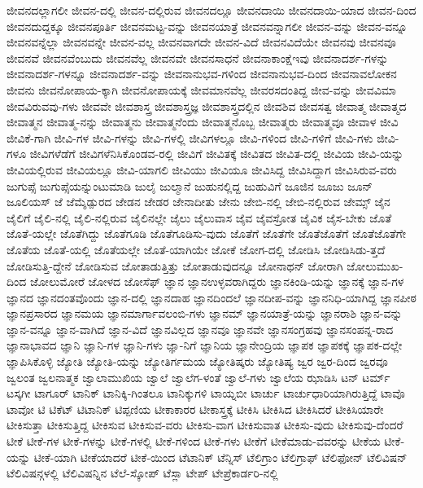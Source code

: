 {ಜೀವನದಲ್ಲಾಗಲೀ
ಜೀವನ-ದಲ್ಲಿ
ಜೀವನ-ದಲ್ಲಿರುವ
ಜೀವನದಲ್ಲೂ
ಜೀವನದಾಯಿ
ಜೀವನದಾಯಿ-ಯಾದ
ಜೀವನ-ದಿಂದ
ಜೀವನದುದ್ದಕ್ಕೂ
ಜೀವನಪೂರ್ತಿ
ಜೀವನಮಟ್ಟ-ವನ್ನು
ಜೀವನಯಾತ್ರೆ
ಜೀವನವನ್ನಾಗಲೀ
ಜೀವನ-ವನ್ನು
ಜೀವನ-ವನ್ನೂ
ಜೀವನವನ್ನೆಲ್ಲಾ
ಜೀವನವನ್ನೇ
ಜೀವನ-ವಲ್ಲ
ಜೀವನವಾಗದೇ
ಜೀವನ-ವಿದೆ
ಜೀವನವಿದೆಯೇ
ಜೀವನವು
ಜೀವನವೂ
ಜೀವನವೆ
ಜೀವನವೆಂಬುದು
ಜೀವನವೆಲ್ಲ
ಜೀವನವೇ
ಜೀವನಸಾಧನೆ
ಜೀವನಾಕಾಂಕ್ಷೆಇವು
ಜೀವನಾದರ್ಶ-ಗಳನ್ನು
ಜೀವನಾದರ್ಶ-ಗಳನ್ನೂ
ಜೀವನಾದರ್ಶ-ವನ್ನು
ಜೀವನಾನುಭವ-ಗಳಿಂದ
ಜೀವನಾನುಭವ-ದಿಂದ
ಜೀವನಾವಲೋಕನ
ಜೀವನು
ಜೀವನೋಪಾಯ-ಕ್ಕಾಗಿ
ಜೀವನೋಪಾಯಕ್ಕೆ
ಜೀವಮಾನವೆಲ್ಲ
ಜೀವರಸದಂತಿದ್ದ
ಜೀವ-ವನ್ನು
ಜೀವವಿಮಾ
ಜೀವವಿರುವವು-ಗಳು
ಜೀವವೇ
ಜೀವಶಾಸ್ತ್ರ
ಜೀವಶಾಸ್ತ್ರಜ್ಞ
ಜೀವಶಾಸ್ತ್ರದಲ್ಲಿನ
ಜೀವಶಿವ
ಜೀವಸತ್ವ
ಜೀವಾತ್ಮ
ಜೀವಾತ್ಮದ
ಜೀವಾತ್ಮನ
ಜೀವಾತ್ಮ-ನನ್ನು
ಜೀವಾತ್ಮನು
ಜೀವಾತ್ಮನೆಂದು
ಜೀವಾತ್ಮನೊಬ್ಬ
ಜೀವಾತ್ಮರು
ಜೀವಾತ್ಮವೂ
ಜೀವಾಳ
ಜೀವಿ
ಜೀವಿಕೆ-ಗಾಗಿ
ಜೀವಿ-ಗಳ
ಜೀವಿ-ಗಳನ್ನು
ಜೀವಿ-ಗಳಲ್ಲಿ
ಜೀವಿಗಳಲ್ಲೂ
ಜೀವಿ-ಗಳಿಂದ
ಜೀವಿ-ಗಳಿಗೆ
ಜೀವಿ-ಗಳು
ಜೀವಿ-ಗಳೂ
ಜೀವಿಗಳೆಡೆಗೆ
ಜೀವಿಗಳೆನಿಸಿಕೊಂಡವ-ರಲ್ಲಿ
ಜೀವಿಗೆ
ಜೀವಿತಕ್ಕೆ
ಜೀವಿತದ
ಜೀವಿತ-ದಲ್ಲಿ
ಜೀವಿಯ
ಜೀವಿ-ಯನ್ನು
ಜೀವಿಯಲ್ಲಿರುವ
ಜೀವಿಯಲ್ಲೂ
ಜೀವಿ-ಯಾಗಲಿ
ಜೀವಿಯು
ಜೀವಿಯೂ
ಜೀವಿಸಿದ್ದ
ಜೀವಿಸಿದ್ದಾಗ
ಜೀವಿಸಿರುವ-ವರು
ಜುಗುಪ್ಸೆ
ಜುಗುಪ್ಸೆಯನ್ನುಂಟುಮಾಡಿ
ಜುಲೈ
ಜುಲ್ಮಾನೆ
ಜುಹುನಲ್ಲಿದ್ದ
ಜುಹುವಿಗೆ
ಜೂಜಿನ
ಜೂಜು
ಜೂನ್
ಜೂಲಿಯಸ್
ಜೆ
ಜೆಮ್ಶೆಡ್ಪುರದ
ಜೇಡನ
ಜೇಡರ
ಜೇನಾದೀತು
ಜೇನು
ಜೇಬಿ-ನಲ್ಲಿ
ಜೇಬಿ-ನಲ್ಲಿರುವ
ಜೇಮ್ಸ್
ಜೈನ
ಜೈಲಿಗೆ
ಜೈಲಿ-ನಲ್ಲಿ
ಜೈಲಿ-ನಲ್ಲಿರುವ
ಜೈಲಿನಲ್ಲೇ
ಜೈಲು
ಜೈಲುವಾಸ
ಜೈವ
ಜೈವಸ್ರೋತ
ಜೈವಿಕ
ಜೈಸ-ಬೇಕು
ಜೊತೆ
ಜೊತೆ-ಯಲ್ಲೇ
ಜೊತೆಗಿದ್ದು
ಜೊತೆಗೂಡಿ
ಜೊತೆಗೂಡಿಸು-ವುದು
ಜೊತೆಗೆ
ಜೊತೆಗೇ
ಜೊತೆಜೊತೆಗೆ
ಜೊತೆಜೊತೆಗೇ
ಜೊತೆಯ
ಜೊತೆ-ಯಲ್ಲಿ
ಜೊತೆಯಲ್ಲೇ
ಜೊತೆ-ಯಾಗಿಯೇ
ಜೋಕೆ
ಜೋಗ-ದಲ್ಲಿ
ಜೋಡಿಸಿ
ಜೋಡಿಸಿಡು-ತ್ತದೆ
ಜೋಡಿಸುತ್ತಿ-ದ್ದೇನೆ
ಜೋಡಿಸುವ
ಜೋತಾಡುತ್ತಿತ್ತು
ಜೋತಾಡುವುದನ್ನೂ
ಜೋನಾಥನ್
ಜೋರಾಗಿ
ಜೋಲುಮುಖ-ದಿಂದ
ಜೋಲುಮೋರೆ
ಜೋಳದ
ಜೋಸೆಫ್
ಜ್ಞಾನ
ಜ್ಞಾನಉಳ್ಳವರಾಗಿದ್ದರು
ಜ್ಞಾನಕಿಂಡಿ-ಯನ್ನು
ಜ್ಞಾನಕ್ಕೆ
ಜ್ಞಾನ-ಗಳ
ಜ್ಞಾನದ
ಜ್ಞಾನದಂತವೊಂದು
ಜ್ಞಾನ-ದಲ್ಲಿ
ಜ್ಞಾನದಾಹ
ಜ್ಞಾನದಿಂದಲೆ
ಜ್ಞಾನದೀಪ-ವನ್ನು
ಜ್ಞಾನನಿಧಿ-ಯಾಗಿದ್ದ
ಜ್ಞಾನಪೀಠ
ಜ್ಞಾನಪ್ರಸಾರದ
ಜ್ಞಾನಮಯ
ಜ್ಞಾನಮಾರ್ಗಾವಲಂಬಿ-ಗಳು
ಜ್ಞಾನಮ್
ಜ್ಞಾನಯಾತ್ರೆ-ಯನ್ನು
ಜ್ಞಾನರಾಶಿ
ಜ್ಞಾನ-ವನ್ನು
ಜ್ಞಾನ-ವನ್ನೂ
ಜ್ಞಾನ-ವಾಗಿದೆ
ಜ್ಞಾನ-ವಿದೆ
ಜ್ಞಾನವಿಲ್ಲದ
ಜ್ಞಾನವೂ
ಜ್ಞಾನವೇ
ಜ್ಞಾನಸಂಗ್ರಹವು
ಜ್ಞಾನಸಂಪನ್ನ-ರಾದ
ಜ್ಞಾನಾಭಾವದ
ಜ್ಞಾನಿ
ಜ್ಞಾನಿ-ಗಳ
ಜ್ಞಾನಿ-ಗಳು
ಜ್ಞಾ-ನಿಗೆ
ಜ್ಞಾನಿಯ
ಜ್ಞಾನೇಂದ್ರಿಯ
ಜ್ಞಾಪಕ
ಜ್ಞಾಪಕಕ್ಕೆ
ಜ್ಞಾಪಕ-ದಲ್ಲೇ
ಜ್ಞಾಪಿಸಿಕೊಳ್ಳಿ
ಜ್ಯೋತಿ
ಜ್ಯೋತಿ-ಯನ್ನು
ಜ್ಯೋತಿರ್ಗಮಯ
ಜ್ಯೋತಿಷ್ಕರು
ಜ್ಯೋತಿಷ್ಯ
ಜ್ವರ
ಜ್ವರ-ದಿಂದ
ಜ್ವರವೂ
ಜ್ವಲಂತ
ಜ್ವಲನಾತ್ಮಕ
ಜ್ವಾಲಾಮುಖಿಯ
ಜ್ವಾಲೆ
ಜ್ವಾಲೆಗ-ಳಂತೆ
ಜ್ವಾಲೆ-ಗಳು
ಜ್ವಾಲೆಯ
ಝಾಡಿಸಿ
ಟನ್
ಟರ್ಮ್
ಟಸ್ಕಗೀ
ಟಾಗೂರ್
ಟಾನಿಕ್
ಟಾನಿಕ್ಕಿ-ಗಿಂತಲೂ
ಟಾನಿಕ್ಕುಗಳಿ
ಟಾಯ್ನಬೀ
ಟಾರ್ಚು
ಟಾರ್ಚುಧಾರಿಯಾಗಿರುತ್ತಿದ್ದೆ
ಟಾವೊ
ಟಾವೋ
ಟಿ
ಟಿಕೆಟ್
ಟಿಟಾನಿಕ್
ಟಿಪ್ಪಣಿಯ
ಟೀಕಾಕಾರರ
ಟೀಕಾಸ್ತ್ರಕ್ಕೆ
ಟೀಕಿಸಿ
ಟೀಕಿಸಿದ
ಟೀಕಿಸಿದರೆ
ಟೀಕಿಸಿಯಾರೇ
ಟೀಕಿಸುತ್ತಾ
ಟೀಕಿಸುತ್ತಿದ್ದ
ಟೀಕಿಸುವ
ಟೀಕಿಸುವ-ವರು
ಟೀಕಿಸು-ವಾಗ
ಟೀಕಿಸುವಾತ
ಟೀಕಿಸು-ವುದು
ಟೀಕಿಸುವು-ದೆಂದರೆ
ಟೀಕೆ
ಟೀಕೆ-ಗಳ
ಟೀಕೆ-ಗಳನ್ನು
ಟೀಕೆ-ಗಳಲ್ಲಿ
ಟೀಕೆ-ಗಳಿಂದ
ಟೀಕೆ-ಗಳು
ಟೀಕೆಗೆ
ಟೀಕೆಮಾಡು-ವವರನ್ನು
ಟೀಕೆಯ
ಟೀಕೆ-ಯನ್ನು
ಟೀಕೆ-ಯಾಗಿ
ಟೀಕೆಯಾದರೆ
ಟೀಕೆ-ಯಿಂದ
ಟೆಟಾನಿಕ್
ಟೆನ್ನಿಸ್
ಟೆಲಿಗ್ರಾಂ
ಟೆಲಿಗ್ರಾಫ್
ಟೆಲಿಫೋನ್
ಟೆಲಿವಿಷನ್
ಟೆಲಿವಿಷನ್ಗಳಲ್ಲಿ
ಟೆಲಿವಿಷನ್ನಿನ
ಟೆಲೆ-ಸ್ಕೋಪ್
ಟೆಸ್ಲಾ
ಟೇಪ್
ಟೇಪ್ರೆಕಾರ್ಡರಿ-ನಲ್ಲಿ
}
